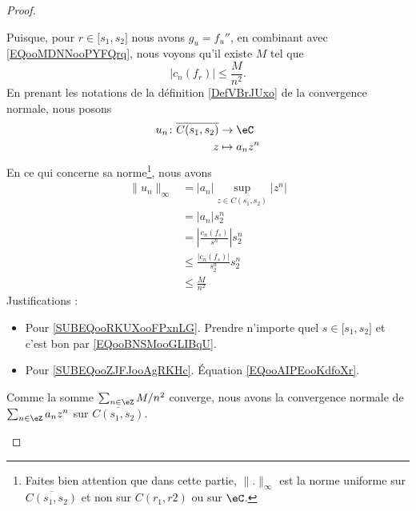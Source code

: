\begin{proof}
\begin{subproof}
\begin{subproof}
			Puisque, pour \( r\in\mathopen[ s_1 , s_2 \mathclose]\) nous avons \( g_u=f_u''\), en combinant avec \eqref{EQooMDNNooPYFQrq}, nous voyons qu'il existe \( M\) tel que
			\begin{equation}        \label{EQooAIPEooKdfoXr}
				| c_n(f_r) |\leq \frac{ M }{ n^2 }.
			\end{equation}
			En prenant les notations de la définition \ref{DefVBrJUxo} de la convergence normale, nous posons
			\begin{equation}
				\begin{aligned}
					u_n\colon \overline{ C(s_1,s_2) } & \to \eC        \\
					z                                 & \mapsto a_nz^n
				\end{aligned}
			\end{equation}
			En ce qui concerne sa norme\footnote{Faites bien attention que dans cette partie, \( \| . \|_{\infty}\) est la norme uniforme sur \( \overline{ C(s_1,s_2) }\) et non sur \( C(r_1,r2)\) ou sur \( \eC\).}, nous avons
			\begin{subequations}
				\begin{align}
					\| u_n \|_{\infty} & =| a_n |\sup_{z\in\overline{ C(s_1,s_2) }}| z^n |                           \\
					                   & =| a_n |s_2^n                                                               \\
					                   & =\left| \frac{ c_n(f_s) }{ s^n } \right| s_2^n  \label{SUBEQooRKUXooFPxnLG} \\
					                   & \leq \frac{ | c_n(f_s) | }{ s_2^n } s_2^n                                   \\
					                   & \leq \frac{ M }{ n^2 }      \label{SUBEQooZJFJooAgRKHc}
				\end{align}
			\end{subequations}
			Justifications :
			\begin{itemize}
				\item Pour \eqref{SUBEQooRKUXooFPxnLG}. Prendre n'importe quel \( s\in \mathopen[ s_1 , s_2 \mathclose]\) et c'est bon par \eqref{EQooBNSMooGLIBqU}.
				\item Pour \eqref{SUBEQooZJFJooAgRKHc}. Équation \eqref{EQooAIPEooKdfoXr}.
			\end{itemize}
			Comme la somme \( \sum_{n\in \eZ}M/n^2\) converge, nous avons la convergence normale de \( \sum_{n\in \eZ}a_nz^n\) sur \( \overline{C(s_1,s_2)}\).


\end{subproof}
\end{subproof}
\end{proof}
